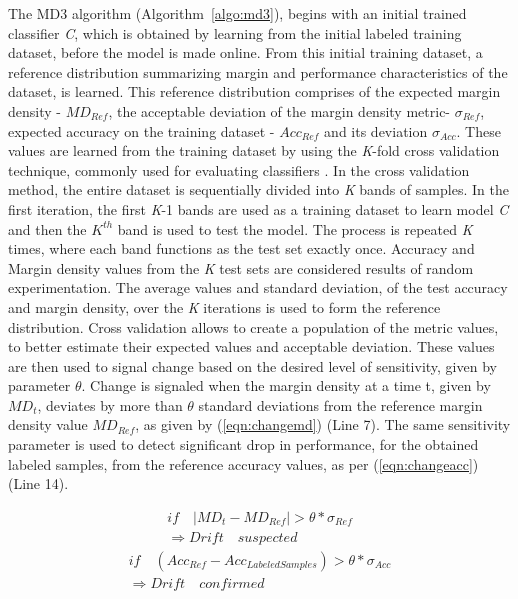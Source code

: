 \documentclass[authoryear,3p,times,twocolumn]{elsarticle}
\begin{document}
The MD3 algorithm (Algorithm~\ref{algo:md3}), begins with an initial trained classifier \textit{C}, which is obtained by learning from the initial labeled training dataset, before the model is made online. From this initial training dataset, a reference distribution summarizing margin and performance characteristics of the dataset, is learned. This reference distribution comprises of the expected margin density - $MD_{Ref}$, the acceptable deviation of the margin density metric- $\sigma_{Ref}$, expected accuracy on the training dataset - $Acc_{Ref}$ and its deviation  $\sigma_{Acc}$. These values are learned from the training dataset by using the \textit{K}-fold cross validation technique, commonly used for evaluating classifiers \citep{kohavi1995study}. In the cross validation method, the entire dataset is sequentially divided into \textit{K} bands of samples. In the first iteration, the first \textit{K}-1 bands are used as a training dataset to learn model \textit{C} and then the $K^{th}$ band is used to test the model. The process is repeated \textit{K} times, where each band functions as the test set exactly once. Accuracy and Margin density values from the \textit{K} test sets are considered results of random experimentation. The average values and standard deviation, of the test accuracy and margin density, over the \textit{K} iterations is used to form the reference distribution. Cross validation allows to create a population of the metric values, to better estimate their expected values and acceptable deviation. These values are then used to signal change based on the desired level of sensitivity, given by parameter $\theta$. Change is signaled when the margin density at a time t, given by $MD_t$, deviates by more than $\theta$ standard deviations from the reference margin density  value $MD_{Ref}$, as given by (\ref{eqn:changemd}) (Line 7). The same sensitivity parameter is used to detect significant drop in performance, for the obtained labeled samples, from the reference accuracy values, as per (\ref{eqn:changeacc}) (Line 14). 

\begin{equation}
\label{eqn:changemd}
\begin{split}
if \quad |MD_t-MD_{Ref}| > \theta * \sigma_{Ref} \\
\Rightarrow Drift\quad suspected
\end{split}
\end{equation}
\begin{equation}
\label{eqn:changeacc}
\begin{split}
if \quad (Acc_{Ref}-Acc_{LabeledSamples}) > \theta * \sigma_{Acc} \\
 \Rightarrow Drift\quad confirmed
\end{split}
\end{equation}
\end{document}
